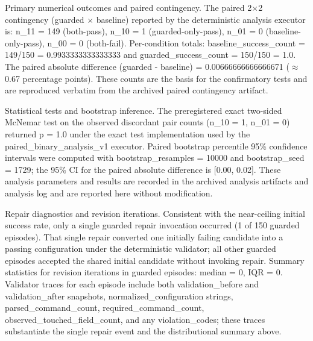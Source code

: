 \documentclass[conference]{IEEEtran}
\begin{document}
Primary numerical outcomes and paired contingency. The paired 2\ensuremath{\times}2 contingency (guarded \ensuremath{\times} baseline) reported by the deterministic analysis executor is: n\_11 = 149 (both-pass), n\_10 = 1 (guarded-only-pass), n\_01 = 0 (baseline-only-pass), n\_00 = 0 (both-fail). Per-condition totals: baseline\_success\_count = 149/150 = 0.9933333333333333 and guarded\_success\_count = 150/150 = 1.0. The paired absolute difference (guarded - baseline) = 0.00666666666666671 (\ensuremath{\approx}0.67 percentage points). These counts are the basis for the confirmatory tests and are reproduced verbatim from the archived paired contingency artifact.

Statistical tests and bootstrap inference. The preregistered exact two-sided McNemar test on the observed discordant pair counts (n\_10 = 1, n\_01 = 0) returned p = 1.0 under the exact test implementation used by the paired\_binary\_analysis\_v1 executor. Paired bootstrap percentile 95\% confidence intervals were computed with bootstrap\_resamples = 10000 and bootstrap\_seed = 1729; the 95\% CI for the paired absolute difference is [0.00, 0.02]. These analysis parameters and results are recorded in the archived analysis artifacts and analysis log and are reported here without modification.

Repair diagnostics and revision iterations. Consistent with the near-ceiling initial success rate, only a single guarded repair invocation occurred (1 of 150 guarded episodes). That single repair converted one initially failing candidate into a passing configuration under the deterministic validator; all other guarded episodes accepted the shared initial candidate without invoking repair. Summary statistics for revision iterations in guarded episodes: median = 0, IQR = 0. Validator traces for each episode include both validation\_before and validation\_after snapshots, normalized\_configuration strings, parsed\_command\_count, required\_command\_count, observed\_touched\_field\_count, and any violation\_codes; these traces substantiate the single repair event and the distributional summary above.
\end{document}
